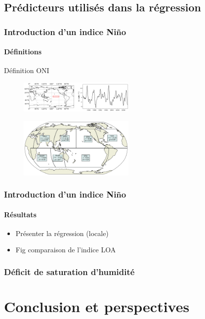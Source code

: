 \documentclass[aspectratio=169, usepdftitle=false, xcolor={dvipsnames}, 9pt,table]{beamer}
\begin{document}
\subsection{Prédicteurs utilisés dans la régression}
\begin{frame}
    \frametitle{Introduction d'un indice Niño}
    \framesubtitle{Définitions}

    Définition ONI
    \begin{figure}
        \centering
        \includegraphics[width=0.5\textwidth]{Figures/ONI.png}
    \end{figure}
    \begin{figure}
        \centering
        \includegraphics[width=0.5\textwidth]{Figures/corr_ONI_bassin.png}
    \end{figure}
\end{frame}

\begin{frame}
    \frametitle{Introduction d'un indice Niño}
    \framesubtitle{Résultats}
    \begin{itemize}
        \item Présenter la régression (locale)
        \item Fig comparaison de l'indice LOA
    \end{itemize}
\end{frame}

\begin{frame}
    \frametitle{Déficit de saturation d'humidité}
    
\end{frame}


\section{Conclusion et perspectives}

%
\end{document}
